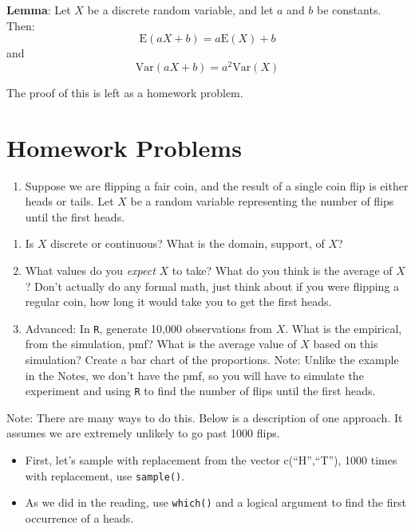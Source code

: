\documentclass[
  letterpaper,
  DIV=11,
  numbers=noendperiod]{scrreprt}
\providecommand{\tightlist}{%
  \setlength{\itemsep}{0pt}\setlength{\parskip}{0pt}}\usepackage{longtable,booktabs,array}
\begin{document}
\textbf{Lemma}: Let \(X\) be a discrete random variable, and let \(a\)
and \(b\) be constants. Then: \[
\mbox{E}(aX+b)=a\mbox{E}(X)+b
\] and \[
\mbox{Var}(aX+b)=a^2\mbox{Var}(X)
\]

The proof of this is left as a homework problem.

\section{Homework Problems}\label{homework-problems-9}

\begin{enumerate}
\def\labelenumi{\arabic{enumi}.}
\tightlist
\item
  Suppose we are flipping a fair coin, and the result of a single coin
  flip is either heads or tails. Let \(X\) be a random variable
  representing the number of flips until the first heads.
\end{enumerate}

\begin{enumerate}
\def\labelenumi{\alph{enumi}.}
\tightlist
\item
  Is \(X\) discrete or continuous? What is the domain, support, of
  \(X\)?\\
\item
  What values do you \emph{expect} \(X\) to take? What do you think is
  the average of \(X\)? Don't actually do any formal math, just think
  about if you were flipping a regular coin, how long it would take you
  to get the first heads.\\
\item
  Advanced: In \texttt{R}, generate 10,000 observations from \(X\). What
  is the empirical, from the simulation, pmf? What is the average value
  of \(X\) based on this simulation? Create a bar chart of the
  proportions. Note: Unlike the example in the Notes, we don't have the
  pmf, so you will have to simulate the experiment and using \texttt{R}
  to find the number of flips until the first heads.
\end{enumerate}

Note: There are many ways to do this. Below is a description of one
approach. It assumes we are extremely unlikely to go past 1000 flips.

\begin{itemize}
\item
  First, let's sample with replacement from the vector c(``H'',``T''),
  1000 times with replacement, use \texttt{sample()}.
\item
  As we did in the reading, use \texttt{which()} and a logical argument
  to find the first occurrence of a heads.
\end{itemize}
\end{document}

